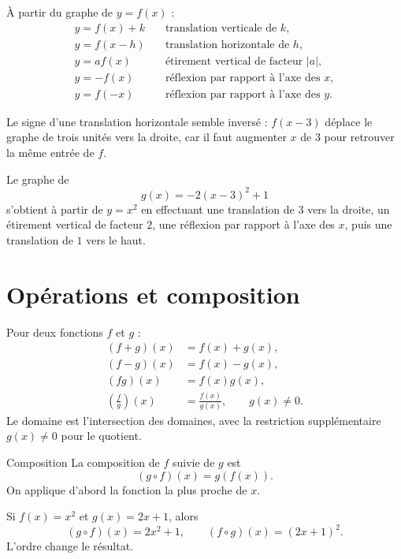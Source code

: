 \documentclass[12pt,a4paper,openany]{book}
\newcommand{\abs}[1]{\left\lvert #1\right\rvert}
\begin{document}
À partir du graphe de $y=f(x)$ :
\begin{align*}
y=f(x)+k&\quad\text{translation verticale de }k,\\
y=f(x-h)&\quad\text{translation horizontale de }h,\\
y=af(x)&\quad\text{étirement vertical de facteur }\abs a,\\
y=-f(x)&\quad\text{réflexion par rapport à l'axe des }x,\\
y=f(-x)&\quad\text{réflexion par rapport à l'axe des }y.
\end{align*}

\begin{warningbox}
Le signe d'une translation horizontale semble inversé : $f(x-3)$ déplace le graphe de trois unités vers la droite, car il faut augmenter $x$ de $3$ pour retrouver la même entrée de $f$.
\end{warningbox}

\begin{examplebox}
Le graphe de
\[
g(x)=-2(x-3)^2+1
\]
s'obtient à partir de $y=x^2$ en effectuant une translation de $3$ vers la droite, un étirement vertical de facteur $2$, une réflexion par rapport à l'axe des $x$, puis une translation de $1$ vers le haut.
\end{examplebox}

\section{Opérations et composition}

Pour deux fonctions $f$ et $g$ :
\begin{align*}
(f+g)(x)&=f(x)+g(x),\\
(f-g)(x)&=f(x)-g(x),\\
(fg)(x)&=f(x)g(x),\\
\left(\frac fg\right)(x)&=\frac{f(x)}{g(x)},\qquad g(x)\neq0.
\end{align*}
Le domaine est l'intersection des domaines, avec la restriction supplémentaire $g(x)\neq0$ pour le quotient.

\begin{definition}{Composition}{}
La composition de $f$ suivie de $g$ est
\[
(g\circ f)(x)=g(f(x)).
\]
On applique d'abord la fonction la plus proche de $x$.
\end{definition}

\begin{examplebox}
Si $f(x)=x^2$ et $g(x)=2x+1$, alors
\[
(g\circ f)(x)=2x^2+1,
\qquad
(f\circ g)(x)=(2x+1)^2.
\]
L'ordre change le résultat.
\end{examplebox}
\end{document}
